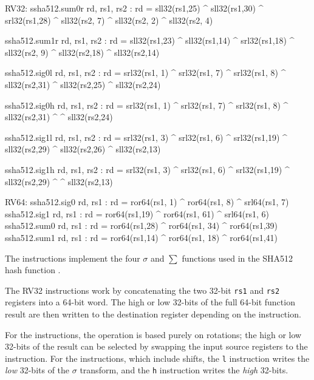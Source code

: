 \begin{cryptoisa}
RV32:
  ssha512.sum0r rd, rs1, rs2 : rd = sll32(rs1,25) ^ sll32(rs1,30)  ^ srl32(rs1,28) ^
                                    sll32(rs2, 7) ^ sll32(rs2, 2)  ^ sll32(rs2, 4)
  
  ssha512.sum1r rd, rs1, rs2 : rd = sll32(rs1,23) ^ sll32(rs1,14)  ^ srl32(rs1,18) ^
                                    sll32(rs2, 9) ^ sll32(rs2,18)  ^ sll32(rs2,14)
  
  ssha512.sig0l rd, rs1, rs2 : rd = srl32(rs1, 1) ^ srl32(rs1, 7) ^ srl32(rs1, 8) ^
                                    sll32(rs2,31) ^ sll32(rs2,25) ^ sll32(rs2,24)
  
  ssha512.sig0h rd, rs1, rs2 : rd = srl32(rs1, 1) ^ srl32(rs1, 7) ^ srl32(rs1, 8) ^
                                    sll32(rs2,31) ^               ^ sll32(rs2,24)
  
  ssha512.sig1l rd, rs1, rs2 : rd = srl32(rs1, 3) ^ srl32(rs1, 6) ^ srl32(rs1,19) ^
                                    sll32(rs2,29) ^ sll32(rs2,26) ^ sll32(rs2,13)
  
  ssha512.sig1h rd, rs1, rs2 : rd = srl32(rs1, 3) ^ srl32(rs1, 6) ^ srl32(rs1,19) ^
                                    sll32(rs2,29) ^               ^ sll32(rs2,13)

RV64:
  ssha512.sig0 rd, rs1 : rd = ror64(rs1, 1) ^ ror64(rs1,  8) ^ srl64(rs1, 7)
  ssha512.sig1 rd, rs1 : rd = ror64(rs1,19) ^ ror64(rs1, 61) ^ srl64(rs1, 6)
  ssha512.sum0 rd, rs1 : rd = ror64(rs1,28) ^ ror64(rs1, 34) ^ ror64(rs1,39)
  ssha512.sum1 rd, rs1 : rd = ror64(rs1,14) ^ ror64(rs1, 18) ^ ror64(rs1,41)
\end{cryptoisa}

The 
instructions implement the four $\sigma$ and $\sum$ functions used in
the SHA512 hash function \cite[Section 4.1.3]{nist:fips:180:4}.

The RV32 instructions work by concatenating the two 32-bit {\tt rs1} and
{\tt rs2} registers into a 64-bit word.
The high or low 32-bits of the full 64-bit function result are then
written to the destination register depending on the instruction.

For the  instructions, the operation is based
purely on rotations;
the high or low 32-bits of the result can be selected by swapping
the input source registers to the instruction.
For the  instructions, which include shifts,
the {\tt *l} instruction writes the {\em low} 32-bits of the $\sigma$
transform, and the {\tt *h} instruction writes the {\em high} 32-bits.

